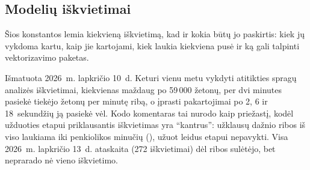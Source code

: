 \subsection{Modelių iškvietimai}\label{sec:config:calls}

Šios konstantos lemia kiekvieną iškvietimą, kad ir kokia būtų jo paskirtis: kiek jų vykdoma
kartu, kaip jie kartojami, kiek laukia kiekviena pusė ir ką gali talpinti vektorizavimo paketas.

\begin{lessonbox}{Išmatuota 2026~m. lapkričio 10~d.}
Keturi vienu metu vykdyti atitikties spragų analizės iškvietimai, kiekvienas maždaug po
59\,000 žetonų, per dvi minutes pasiekė tiekėjo žetonų per minutę ribą, o įprasti pakartojimai
po 2, 6 ir 18~sekundžių ją pasiekė vėl. Kodo komentaras tai nurodo kaip priežastį, kodėl
užduoties etapui priklausantis iškvietimas yra \enquote{kantrus}: užklausų dažnio ribos
iš viso laukiama iki penkiolikos minučių (), užuot leidus etapui
nepavykti. Visa 2026~m. lapkričio 13~d. ataskaita (272 iškvietimai) dėl ribos sulėtėjo, bet
neprarado nė vieno iškvietimo.
\end{lessonbox}

